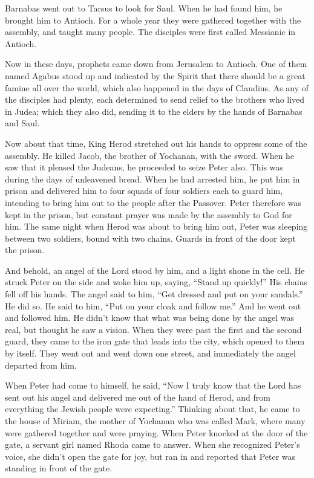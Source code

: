 \myverse{}Barnabas went out to Tarsus to look for Saul.
\myverse{}When he had found him, he brought him to Antioch. For a whole year they were
gathered together with the assembly, and taught many people. The disciples were first called Messianic
in Antioch.

\myverse{}Now in these days, prophets came down from Jerusalem to Antioch.
\myverse{}One of them named Agabus stood up and indicated by the Spirit that there
should be a great famine all over the world, which also happened in the days of Claudius.
\myverse{}As any of the disciples had plenty, each determined to send relief to the
brothers who lived in Judea;
\myverse{}which they also did, sending it to the elders by the hands of Barnabas and
Saul.


\mychapter{} \myverse*{}Now about that time, King Herod stretched out his hands to oppress
some of the assembly.
\myverse{}He killed Jacob, the brother of Yochanan, with the sword.
\myverse{}When he saw that it pleased the Judeans, he proceeded to seize Peter also.
This was during the days of unleavened bread.
\myverse{}When he had arrested him, he put him in prison and delivered him to four squads
of four soldiers each to guard him, intending to bring him out to the people after the Passover.
\myverse{}Peter therefore was kept in the prison, but constant prayer was made by the
assembly to God for him.
\myverse{}The same night when Herod was about to bring him out, Peter was sleeping between
two soldiers, bound with two chains. Guards in front of the door kept the prison.

\myverse{}And behold, an angel of the Lord stood by him, and a light shone
in the cell. He struck Peter on the side and woke him up, saying, “Stand up quickly!” His chains fell
off his hands.
\myverse{}The angel said to him, “Get dressed and put on your sandals.” He did so. He
said to him, “Put on your cloak and follow me.”
\myverse{}And he went out and followed him. He didn’t know that what was being done by
the angel was real, but thought he saw a vision.
\myverse{}When they were past the first and the second guard, they came to the iron
gate that leads into the city, which opened to them by itself. They went out and went down one street,
and immediately the angel departed from him.

\myverse{}When Peter had come to himself, he said, “Now I truly know that
the Lord has sent out his angel and delivered me out of the hand of Herod, and from everything the Jewish
people were expecting.”
\myverse{}Thinking about that, he came to the house of Miriam, the mother of Yochanan
who was called Mark, where many were gathered together and were praying.
\myverse{}When Peter knocked at the door of the gate, a servant girl named Rhoda came
to answer.
\myverse{}When she recognized Peter’s voice, she didn’t open the gate for joy, but
ran in and reported that Peter was standing in front of the gate.

